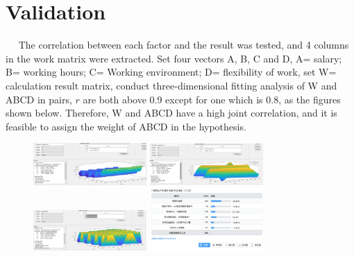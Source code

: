\documentclass[12pt]{article}
\begin{document}
\section{Validation}
~~
The correlation between each factor and the result was tested, and 4 columns in the work matrix were extracted. Set four vectors A, B, C and D, A= salary; B= working hours; C= Working environment; D= flexibility of work, set W= calculation result matrix, conduct three-dimensional fitting analysis of W and ABCD in pairs, $r$ are both above 0.9 except for one which is 0.8, as the figures shown below. Therefore, W and ABCD have a high joint correlation, and it is feasible to assign the weight of ABCD in the hypothesis.
\begin{figure}[htbp]
    \centering
    {
    \begin{minipage}[t]{0.3\linewidth}
    \centering
    \includegraphics[width=1.7in]{figure/pict1.jpg}
    \end{minipage}%
    }%
    {
    \begin{minipage}[t]{0.3\linewidth}
    \centering
    \includegraphics[width=1.7in]{figure/pict2.jpg}
    \end{minipage}%
    }%
    {
    \begin{minipage}[t]{0.3\linewidth}
    \centering
    \includegraphics[width=1.7in]{figure/pict3.jpg}
    \end{minipage}
    }%
    {
    \begin{minipage}[t]{0.3\linewidth}
    \centering
    \includegraphics[width=1.7in]{figure/pic4.png}

\end{minipage}}
\end{figure}
\end{document}
